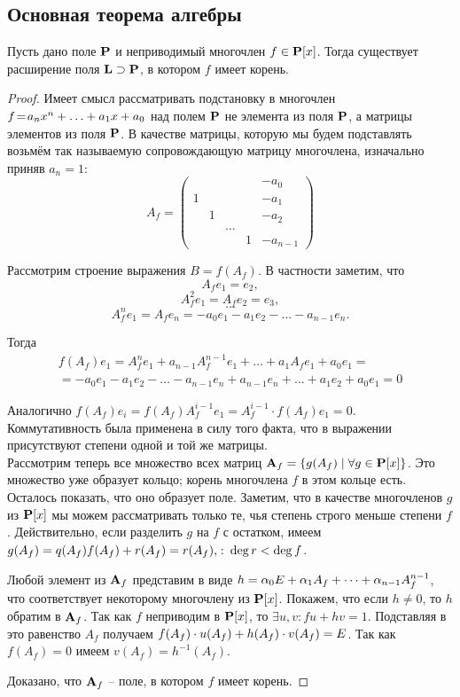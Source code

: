 \subsection{Основная теорема алгебры}

\begin{theorem}
  Пусть дано поле $\mathbf{P}$ и неприводимый многочлен $f\in\mathbf{P}[x]$. Тогда существует расширение поля $\mathbf{L}\supset\mathbf{P}$, в котором $f$ имеет корень.
\end{theorem}
\begin{proof}
  Имеет смысл рассматривать подстановку в многочлен $f\!=\!a_nx^n\bw+\dots\bw+a_1x+a_0$ над полем $\mathbf{P}$ не элемента из поля $\mathbf{P}$, а матрицы элементов из поля $\mathbf{P}$. В качестве матрицы, которую мы будем подставлять возьмём так называемую сопровождающую матрицу многочлена, изначально приняв $a_n=1$:
$$
A_f=\left(
\begin{matrix}
  & &      & & -a_0\\
 1& &      & & -a_1\\
  &1&      & & -a_2\\
  & &\dots & &     \\
  & &      &1& -a_{n-1}
\end{matrix}
\right)
$$

Рассмотрим строение выражения $B=f(A_f)$. В частности заметим, что
$$A_fe_1=e_2,$$
$$A^2_fe_1 = A_fe_2=e_3,$$
$$\dots$$
$$A^n_fe_1 = A_fe_n=-a_0e_1-a_1e_2-\dots-a_{n-1}e_n.$$

Тогда 
\begin{multline*}f(A_f)e_1 = A_f^ne_1+a_{n-1}A^{n-1}_fe_1+\dots+a_1A_fe_1+a_0e_1=\\=-a_0e_1-a_1e_2-\dots-a_{n-1}e_n+a_{n-1}e_n+\dots+a_1e_2+a_0e_1=0\end{multline*}

Аналогично $f(A_f)e_i=f(A_f)A_f^{i-1}e_1=A_f^{i-1}\cdot f(A_f)e_1=0$. Коммутативность была применена в силу того факта, что в выражении присутствуют степени одной и той же матрицы.\\

Рассмотрим теперь все множество всех матриц $\mathbf{A}_f = \{g(A_f)\mid \forall g\in\mathbf{P}[x]\}$. Это множество уже образует кольцо; корень многочлена $f$ в этом кольце есть. Осталось показать, что оно образует поле. Заметим, что в качестве многочленов $g$ из $\mathbf{P}[x]$ мы можем рассматривать только те, чья степень строго меньше степени $f$. Действительно, если разделить $g$ на $f$ с остатком, имеем $g(A_f)\bw=q(A_f)f(A_f)+r(A_f)=r(A_f),\spc\deg r<\deg f$.

Любой элемент из $\mathbf{A}_f$ представим в виде $h=\alpha_0E+\alpha_1A_f+\dots+\alpha_{n-1}A_f^{n-1}$, что соответствует некоторому многочлену из $\mathbf{P}[x]$. Покажем, что если $h\ne0$, то $h$ обратим в $\mathbf{A}_f$. Так как $f$ неприводим в $\mathbf{P}[x]$, то $\exists u,v\colon fu+hv=1$. Подставляя в это равенство $A_f$ получаем $f(A_f)\cdot u(A_f)+h(A_f)\cdot v(A_f)\bw=E$. Так как $f(A_f)=0$ имеем $v(A_f)=h^{-1}(A_f)$.

Доказано, что $\mathbf{A}_f$ -- поле, в котором $f$ имеет корень.
\end{proof}

